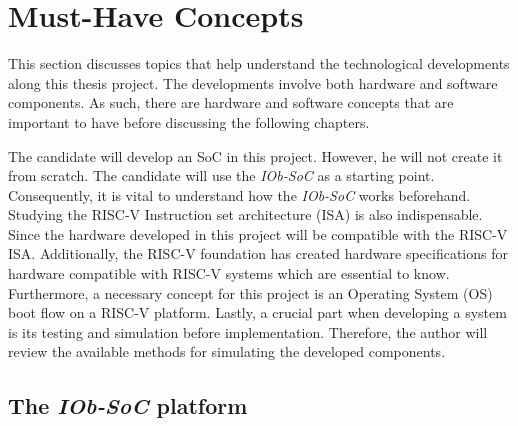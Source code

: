 
\section{Must-Have Concepts}
\label{sec:must_have_concepts}

This section discusses topics that help understand the technological developments along this thesis project. The developments involve both hardware and software components. As such, there are hardware and software concepts that are important to have before discussing the following chapters.

The candidate will develop an SoC in this project. However, he will not create it from scratch. The candidate will use the \textit{IOb-SoC} as a starting point. Consequently, it is vital to understand how the \textit{IOb-SoC} works beforehand. Studying the RISC-V Instruction set architecture (ISA) is also indispensable. Since the hardware developed in this project will be compatible with the RISC-V ISA.
Additionally, the RISC-V foundation has created hardware specifications for hardware compatible with RISC-V systems which are essential to know. Furthermore, a necessary concept for this project is an Operating System (OS) boot flow on a RISC-V platform. Lastly, a crucial part when developing a system is its testing and simulation before implementation. Therefore, the author will review the available methods for simulating the developed components.


\subsection{The \textit{IOb-SoC} platform}

